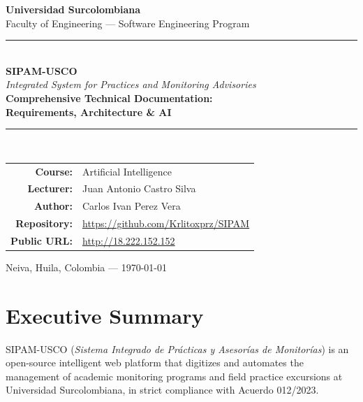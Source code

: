 \documentclass[12pt,a4paper,twoside]{report}
\begin{document}

\begin{titlepage}
\centering\vspace*{0.8cm}
{\LARGE\bfseries\textcolor{uscoRed}{Universidad Surcolombiana}}\\[0.3cm]
{\large Faculty of Engineering — Software Engineering Program}\\[1.8cm]
\textcolor{uscoRed}{\rule{\textwidth}{2.5pt}}\\[0.7cm]
{\fontsize{28}{32}\selectfont\bfseries SIPAM-USCO}\\[0.4cm]
{\Large\itshape Integrated System for Practices and Monitoring Advisories}\\[0.5cm]
{\LARGE\bfseries Comprehensive Technical Documentation:\\Requirements, Architecture \& AI}\\[0.7cm]
\textcolor{uscoRed}{\rule{\textwidth}{2.5pt}}\\[2cm]
\begin{tabular}{rl}
  \textbf{Course:}      & Artificial Intelligence \\[0.4cm]
  \textbf{Lecturer:}    & Juan Antonio Castro Silva \\[0.4cm]
  \textbf{Author:}      & Carlos Ivan Perez Vera \\[0.4cm]
  \textbf{Repository:}  & \url{https://github.com/Krlitoxprz/SIPAM} \\[0.4cm]
  \textbf{Public URL:}  & \url{http://18.222.152.152} \\
\end{tabular}
\vfill
{\large Neiva, Huila, Colombia \quad — \quad \today}
\end{titlepage}

\chapter*{Executive Summary}

SIPAM-USCO (\textit{Sistema Integrado de Prácticas y Asesorías de Monitorías}) is an open-source
intelligent web platform that digitizes and automates the management of academic monitoring programs
and field practice excursions at Universidad Surcolombiana, in strict compliance with Acuerdo 012/2023.
\end{document}
